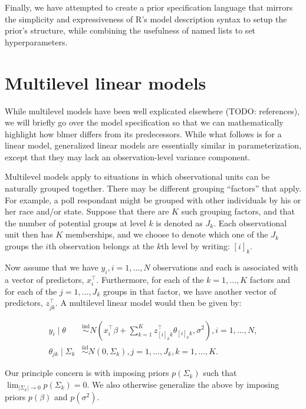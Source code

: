 \documentclass[10pt]{article}
\let\proglang=\textsf
\newcommand{\pkg}[1]{{\fontseries{b}\selectfont #1}}
\begin{document}
Finally, we have attempted to create a prior specification language
that mirrors the simplicity and expressiveness of \proglang{R}'s
model description syntax to setup the prior's structure, while combining the usefulness of
named lists to set hyperparameters.

\section[Multilevel linear models]{Multilevel linear models}

While multilevel models have been well explicated elsewhere
(TODO: references), we will briefly go over the model specification so that
we can mathematically highlight how \pkg{blmer} differs from its predecessors. While
what follows is for a linear model, generalized linear models are
essentially similar in parameterization, except that they may lack an
observation-level variance component.

Multilevel models apply to situations in which observational units can
be naturally grouped together. There may be different grouping
``factors'' that apply. For
example, a poll respondant might be grouped with other individuals by his or her race and/or
state. Suppose that there are $K$ such grouping factors,
and that the number of potential groups at level $k$ is denoted as
$J_k$. Each observational unit then has $K$ memberships, and we choose to
denote which one of the $J_k$ groups the $i$th
observation belongs at the $k$th level by writing: $[i]_k$.

Now assume that we have $y_i, i=1, \ldots, N$ observations and each is associated
with a vector of predictors, $x_i^\top$. Furthermore, for each of the
$k=1,\ldots,K$ factors and for each of the $j=1, \ldots, J_k$ groups
in that factor, we have another vector of predictors, $z_{jk}^\top$. A
multilevel linear model would then be given by:

\begin{align*}
y_i \mid \theta & \overset{\text{ind}}{\sim} N\left(x_i^\top\beta +
  \sum_{k=1}^Kz_{[i]_kk}^\top\theta_{[i]_kk}, \sigma^2 \right), i=1,
\ldots, N, \\
\theta_{jk} \mid \Sigma_k & \overset{\text{iid}}{\sim} N\left(0, \Sigma_k\right),
j=1, \ldots, J_k, k=1, \ldots, K.
\end{align*}

\noindent Our principle concern is with imposing priors $p(\Sigma_k)$ such that
$\lim_{|\Sigma_k| \rightarrow 0} p(\Sigma_k) = 0$. We also otherwise
generalize the above by imposing priors $p(\beta)$ and $p(\sigma^2)$.
\end{document}
